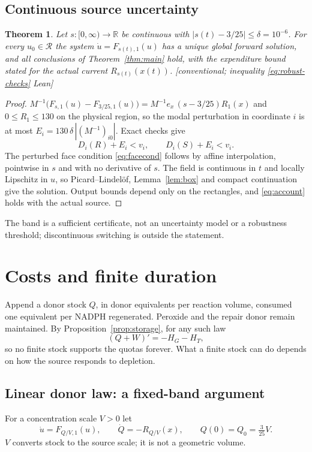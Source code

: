 \documentclass[11pt,a4paper]{article}
\theoremstyle{plain}
\newtheorem{theorem}{Theorem}[section]
\theoremstyle{definition}
\theoremstyle{remark}
\newcommand{\R}{\mathbb R}
\newcommand{\HG}{H_G}
\newcommand{\HT}{H_T}
\newcommand{\RR}{\mathcal R}
\newcommand{\evid}[1]{\textnormal{\textsf{\small[#1]}}}
\begin{document}
\subsection{Continuous source uncertainty}
\begin{theorem}\label{thm:robust}
Let $s:[0,\infty)\to\R$ be continuous with $|s(t)-3/25|\le\delta=10^{-6}$. For
every $u_0\in\RR$ the system $\dot u=F_{s(t),1}(u)$ has a unique global forward
solution, and all conclusions of Theorem~\ref{thm:main} hold, with the
expenditure bound stated for the actual current $R_{s(t)}(x(t))$.
\evid{conventional; inequality \eqref{eq:robust-checks} Lean}
\end{theorem}
\begin{proof}
$M^{-1}\bigl(F_{s,1}(u)-F_{3/25,1}(u)\bigr)=M^{-1}e_x\,(s-3/25)R_1(x)$ and
$0\le R_1\le130$ on the physical region, so the modal perturbation in
coordinate $i$ is at most $E_i=130\,\delta\,|(M^{-1})_{i0}|$. Exact checks give
\begin{equation}\label{eq:robust-checks}
D_i(R)+E_i<v_i,\qquad D_i(S)+E_i<v_i .
\end{equation}
The perturbed face condition \eqref{eq:facecond} follows by affine
interpolation, pointwise in $s$ and with no derivative of $s$. The field is
continuous in $t$ and locally Lipschitz in $u$, so Picard--Lindel\"of,
Lemma~\ref{lem:box} and compact continuation \citep{walter1998} give the
solution. Output bounds depend only on the rectangles, and \eqref{eq:account}
holds with the actual source.
\end{proof}
The band is a sufficient certificate, not an uncertainty model or a robustness
threshold; discontinuous switching is outside the statement.

\section{Costs and finite duration}\label{sec:duration}

Append a donor stock $Q$, in donor equivalents per reaction volume, consumed
one equivalent per NADPH regenerated. Peroxide and the repair donor remain
maintained. By Proposition~\ref{prop:storage}, for any such law
\begin{equation}\label{eq:total-stock}
(Q+W)'=-\HG-\HT,
\end{equation}
so no finite stock supports the quotas forever. What a finite stock can do
depends on how the source responds to depletion.

\subsection{Linear donor law: a fixed-band argument}
For a concentration scale $V>0$ let
\begin{equation}\label{eq:donor}
\dot u=F_{Q/V,1}(u),\qquad\dot Q=-R_{Q/V}(x),\qquad Q(0)=Q_0=\tfrac3{25}V .
\end{equation}
$V$ converts stock to the source scale; it is not a geometric volume.
\end{document}
